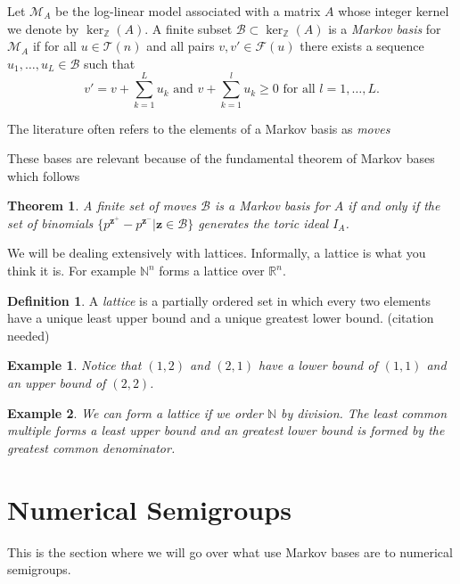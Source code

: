 \documentclass[11pt]{amsart}
\theoremstyle{plain}
\newtheorem{thm}{Theorem}
\newtheorem{fact}{Fact}
\newtheorem{exa}{Example}
\theoremstyle{definition}
\newtheorem{defi}{Definition}
\begin{document}
Let $\mathcal{M}_A$ be the log-linear model associated with a matrix $A$ whose integer kernel we denote by $\ker_\mathbb{Z}(A)$.
A finite subset $\mathcal{B}\subset\ker_{\mathbb{Z}}(A)$ is a \emph{Markov basis} for $\mathcal{M}_A$ if for all $u\in \mathcal{T}(n)$ and all pairs $v,v'\in \mathcal{F}(u)$ there exists a sequence $u_1,\dots,u_L\in  \mathcal{B}$ such that
\[v'=v+\sum\limits_{k=1}^L{u_k}\text{ and }v+\sum\limits_{k=1}^l{u_k}\ge 0\text{ for all }l=1,\dots,L.\]

The literature often refers to the elements of a Markov basis as \emph{moves}\cite[p.16]{bernd}

These bases are relevant because of the fundamental theorem of Markov bases which follows\cite{aoki}
\begin{thm}
A finite set of moves $\mathcal{B}$ is a Markov basis for $A$ if and only if the set of binomials $\{p^{\mathbf{z}^+}-p^{\mathbf{z}^-}|\mathbf{z}\in \mathcal{B}\}$ generates the toric ideal $I_A$.
\end{thm}

We will be dealing extensively with lattices. Informally, a lattice is what you think it is. For example $\mathbb{N}^n$ forms a lattice over $\mathbb{R}^n$.
\begin{defi}
A \emph{lattice} is a partially ordered set in which every two elements have a unique least upper bound and a unique greatest lower bound. (citation needed)
\end{defi}
\begin{exa}
Notice that $(1,2)$ and $(2,1)$ have a lower bound of $(1,1)$ and an upper bound of $(2,2)$.
\end{exa}
\begin{exa}
We can form a lattice if we order $\mathbb{N}$ by division. The least common multiple forms a least upper bound and an greatest lower bound is formed by the greatest common denominator.
\end{exa}



\section{Numerical Semigroups}
This is the section where we will go over what use Markov bases are to numerical semigroups.
\end{document}
